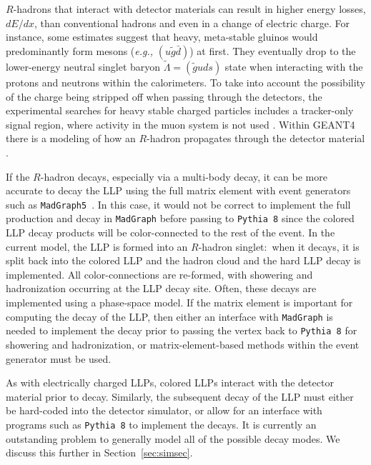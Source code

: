 $R$-hadrons that interact with detector materials can result in higher energy losses, $dE/dx$, than conventional hadrons and even in a change of electric charge.  For instance, some estimates \cite{Buccella:1985cs,Farrar:2010ps} suggest that heavy, meta-stable gluinos would predominantly form mesons (\emph{e.g.,}  $(u \tilde g \bar d)$) at first. They  eventually drop to the lower-energy neutral singlet baryon $\tilde \Lambda = (\tilde g u d s)$ state when interacting with the protons and neutrons within the calorimeters.  To take into account the possibility of the charge being stripped off when passing through the detectors, the experimental searches for heavy stable charged particles includes a tracker-only signal region, where activity in the muon system is not used \cite{Aaboud:2016uth,CMS:2016ybj}.  Within GEANT4 \cite{Agostinelli:2002hh} there is a modeling of how an $R$-hadron propagates through the detector material \cite{Mackeprang:2009ad}.  

If the $R$-hadron decays, especially via a multi-body decay, it can be more accurate to decay the LLP using the full matrix element with event generators such as \texttt{MadGraph5}~\cite{Alwall:2011uj,Alwall:2014hca}. In this case, it would not be correct to implement the full production and decay in \texttt{MadGraph} before passing to \texttt{Pythia 8} since the colored LLP decay products will be color-connected to the rest of the event. In the current model, the LLP is formed into an $R$-hadron singlet:~when it decays, it is split back into the colored LLP and the hadron cloud and the hard LLP decay is implemented. All color-connections are re-formed, with showering and hadronization occurring at the LLP decay site. Often, these decays are implemented using a phase-space model. If the matrix element is important for computing the decay of the LLP, then either an interface with \texttt{MadGraph} is needed to implement the decay prior to passing the vertex back to \texttt{Pythia 8} for showering and hadronization, or matrix-element-based methods within the event generator must be used.

As with electrically charged LLPs, colored LLPs interact with the detector material prior to decay. Similarly, the subsequent decay of the LLP must either be hard-coded into the detector simulator, or allow for an interface with programs such as \texttt{Pythia 8} to implement the decays. It is currently an outstanding problem to generally model all of the possible decay modes. We discuss this further in Section~\ref{sec:simsec}.

